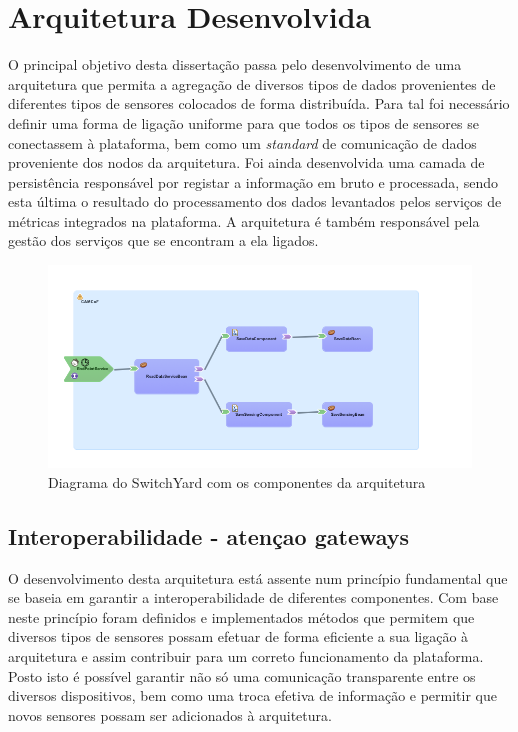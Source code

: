 \chapter{Arquitetura Desenvolvida}

O principal objetivo desta dissertação passa pelo desenvolvimento de uma arquitetura que permita a agregação de diversos tipos de dados provenientes de diferentes tipos de sensores colocados de forma distribuída. Para tal foi necessário definir uma forma de ligação uniforme para que todos os tipos de sensores se conectassem à plataforma, bem como um \textit{standard} de comunicação de dados proveniente dos nodos da arquitetura. Foi ainda desenvolvida uma camada de persistência responsável por registar a informação em bruto e processada, sendo esta última o resultado do processamento dos dados levantados pelos serviços de métricas integrados na plataforma. A arquitetura é também responsável pela gestão dos serviços que se encontram a ela ligados.

\begin{figure}[htb]
   \centering
   \includegraphics[scale=0.55]{Images/switchyard.png}
   \caption{Diagrama do SwitchYard com os componentes da arquitetura}
\end{figure}

\section{Interoperabilidade - atençao gateways}

O desenvolvimento desta arquitetura está assente num princípio fundamental que se baseia em garantir a interoperabilidade de diferentes componentes. Com base neste princípio foram definidos e implementados métodos que permitem que diversos tipos de sensores possam efetuar de forma eficiente a sua ligação à arquitetura e assim contribuir para um correto funcionamento da plataforma. Posto isto é possível garantir não só uma comunicação transparente entre os diversos dispositivos, bem como uma troca efetiva de informação e permitir que novos sensores possam ser adicionados à arquitetura.

